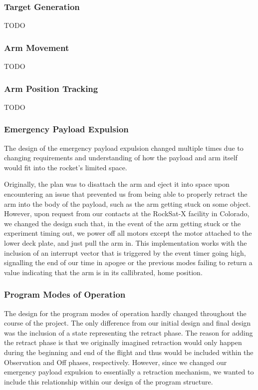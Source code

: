 \subsubsection{Target Generation}
TODO

\subsubsection{Arm Movement}
TODO

\subsubsection{Arm Position Tracking}
TODO

\subsubsection{Emergency Payload Expulsion}
The design of the emergency payload expulsion changed multiple times due to
changing requirements and understanding of how the \gls{payload} and arm itself would fit into the rocket's limited space.

Originally, the plan was to disattach the arm and eject it into space upon
encountering an issue that prevented us from being able to properly retract the arm into the body of the payload,
such as the arm getting stuck on some object. However, upon request from our contacts at the RockSat-X facility in 
Colorado, we changed the design such that, in the event of the arm getting stuck or the experiment timing out, 
we power off all motors except the motor attached to the lower deck plate, and just pull the arm in. This
implementation works with the inclusion of an interrupt vector that is triggered by the event timer
going high, signalling the end of our time in apogee or the previous modes failing to return a value indicating
that the arm is in its callibrated, home position.

\subsubsection{Program Modes of Operation}
The design for the program modes of operation hardly changed throughout the course of the project.
The only difference from our initial design and final design was the inclusion of a state representing the
retract phase. The reason for adding the retract phase is that we originally imagined retraction would only happen during the beginning
and end of the flight and thus would be included within the Observation and Off phases, respectively. However, since we changed our
emergency payload expulsion to essentially a retraction mechanism, we wanted to include this relationship within our design of the
program structure.

